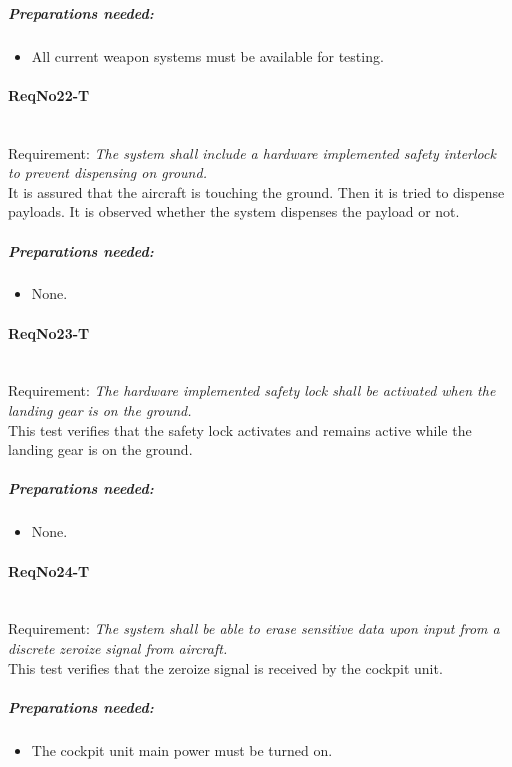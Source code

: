 	\subparagraph{Preparations needed:}
	\begin{itemize}
	\item All current weapon systems must be available for testing.
	\end{itemize} 
	

\paragraph{ReqNo22-T}\mbox{}\\ %
Requirement: \textit{The system shall include a hardware implemented safety interlock to prevent dispensing on ground.}
\\
It is assured that the aircraft is touching the ground. Then it is tried to dispense payloads. It is observed whether the system dispenses the payload or not.
\\
	\subparagraph{Preparations needed:}
	\begin{itemize}
	\item None.
	\end{itemize} 

\paragraph{ReqNo23-T}\mbox{}\\ %
Requirement: \textit{The hardware implemented safety lock shall be activated when the landing gear is on the ground.}
\\
This test verifies that the safety lock activates and remains active while the
landing gear is on the ground.
\\
	\subparagraph{Preparations needed:}
	\begin{itemize}
	\item None.
	\end{itemize} 

\paragraph{ReqNo24-T}\mbox{}\\ %
Requirement: \textit{The system shall be able to erase sensitive data upon input from a discrete zeroize signal from aircraft.}\\

This test verifies that the zeroize signal is received by the cockpit unit.
	\subparagraph{Preparations needed:}
	\begin{itemize}
	\item The cockpit unit main power must be turned on.
	\end{itemize}
